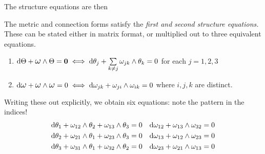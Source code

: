  The structure equations are then

\begin{thm}{}{}
The metric and connection forms satisfy the \emph{first and second structure equations.} These can be stated either in matrix format, or multiplied out to three equivalent equations.
\begin{enumerate}
  \item $\D\Theta+\lomega\wedge\Theta=\V0\iff \D\theta_j+\sum\limits_{k\neq j}\omega_{jk}\wedge\theta_k=0$ for each $j=1,2,3$
  \item $\D\lomega+\lomega\wedge\lomega=0\iff \D\omega_{jk}+\omega_{ji}\wedge\omega_{ik}=0$ where $i,j,k$ are distinct.
\end{enumerate}
Writing these out explicitly, we obtain six equations: note the pattern in the indices!
\begin{align*}
&\mathrm{d}\theta_1+\omega_{12}\wedge\theta_2+\omega_{13}\wedge\theta_3=0 &&\mathrm{d}\omega_{12}+\omega_{13}\wedge\omega_{32}=0\\
&\mathrm{d}\theta_2+\omega_{21}\wedge\theta_1+\omega_{23}\wedge\theta_3=0 &&\mathrm{d}\omega_{13}+\omega_{12}\wedge\omega_{23}=0\\
&\mathrm{d}\theta_3+\omega_{31}\wedge\theta_1+\omega_{32}\wedge\theta_2=0 &&\mathrm{d}\omega_{23}+\omega_{21}\wedge\omega_{13}=0
\end{align*}
\end{thm}

